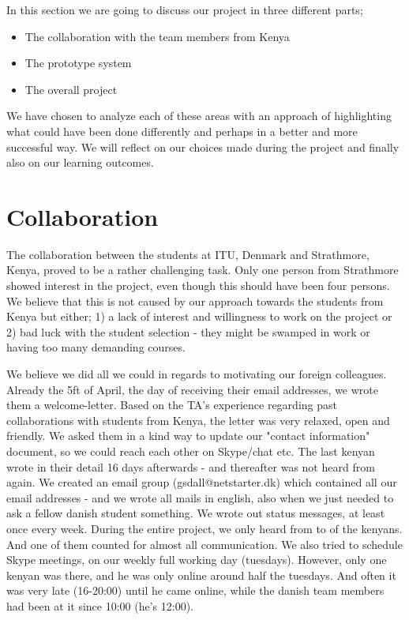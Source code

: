 In this section we are going to discuss our project in three different parts;

\begin{itemize}
	\item The collaboration with the team members from Kenya
	\item The prototype system
	\item The overall project
\end{itemize}

We have chosen to analyze each of these areas with an approach of highlighting what could have been done differently and perhaps in a better and more successful way. We will reflect on our choices made during the project and finally also on our learning outcomes.

\section{Collaboration}\label{sec:discussioncollaboration}
The collaboration between the students at ITU, Denmark and Strathmore, Kenya, proved to be a rather challenging task. Only one person from Strathmore showed interest in the project, even though this should have been four persons. We believe that this is not caused by our approach towards the students from Kenya but either; 1) a lack of interest and willingness to work on the project or 2) bad luck with the student selection - they might be swamped in work or having too many demanding courses.

We believe we did all we could in regards to motivating our foreign colleagues. Already the 5ft of April, the day of receiving their email addresses, we wrote them a welcome-letter. Based on the TA's experience regarding past collaborations with students from Kenya, the letter was very relaxed, open and friendly. We asked them in a kind way to update our "contact information" document, so we could reach each other on Skype/chat etc. The last kenyan wrote in their detail 16 days afterwards - and thereafter was not heard from again. We created an email group (gsdall@netstarter.dk) which contained all our email addresses - and we wrote all mails in english, also when we just needed to ask a fellow danish student something. We wrote out status messages, at least once every week. During the entire project, we only heard from to of the kenyans. And one of them counted for almost all communication. We also tried to schedule Skype meetings, on our weekly full working day (tuesdays). However, only one kenyan was there, and he was only online around half the tuesdays. And often it was very late (16-20:00) until he came online, while the danish team members had been at it since 10:00 (he's 12:00).

